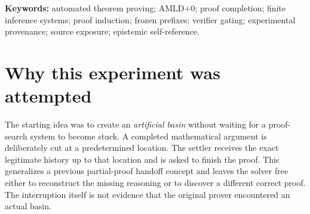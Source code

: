 \documentclass[11pt,letterpaper]{article}
\begin{document}
\begin{abstract}
We report a proof-completion experiment centered on the \emph{Induction Principle on Proofs} from Brian Tenneson's \emph{Depths of a Simulation} 45.2. The researcher selected a theorem and required the entire admissible history to be represented as one conjunction of the theorem's assumptions and the actual proof prefix, with induction-step assumptions properly scoped. The handoff was frozen after the sentence asserting that all earlier proof lines belong to an inference-closed set. A revision moved the cutoff earlier than an initially discussed 75\% split: 51 of 100 whitespace-delimited words of the source proof were visible. A subsequent armed prompt asked an in-chat AMLD+0-style settler to finish the proof, permitting a different valid argument. The response completed the proof by ordinary induction, and a later comparison found it mathematically sound and methodologically equivalent to the source. We carefully distinguish mathematical completion, an in-chat role simulation, a first-person future-tense settlement claim, a genuine blind discovery trial, and independently certified execution. Because this conversation previously contained the full source proof, and because no external governing verifier, authenticated solver run, frozen budget, or measured cost ledger was established, the episode documents a \emph{sound reconstruction demonstration and an informative protocol rehearsal}, not independent AMLD+0 discovery or a certified empirical performance result. The note preserves the successful mathematical argument, identifies the audit boundaries, and states the minimum conditions for a future controlled replication.
\end{abstract}

\noindent\textbf{Keywords:} automated theorem proving; AMLD+0; proof completion; finite inference systems; proof induction; frozen prefixes; verifier gating; experimental provenance; source exposure; epistemic self-reference.

\section{Why this experiment was attempted}
The starting idea was to create an \emph{artificial basin} without waiting for a proof-search system to become stuck. A completed mathematical argument is deliberately cut at a predetermined location. The settler receives the exact legitimate history up to that location and is asked to finish the proof. This generalizes a previous partial-proof handoff concept and leaves the solver free either to reconstruct the missing reasoning or to discover a different correct proof. The interruption itself is not evidence that the original prover encountered an actual basin.
\end{document}
